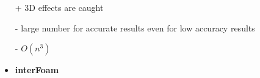 \begin{frame}
\begin{minipage}{0.35\textwidth}
\begin{tcolorbox} [
colframe=TUMOrange,
colback=TUMOrange!50,
title = \centering Navier-Stokes\\3D]     
\begin{itemize}
\item[+] 3D effects are caught
\item[-] large number for accurate results even for low accuracy results
\item[-] $O(n^3)$\vspace{0.6cm}
\item<2-> \large \textbf{interFoam}
\end{itemize}
\end{tcolorbox}    
\end{minipage}


 \end{frame}




